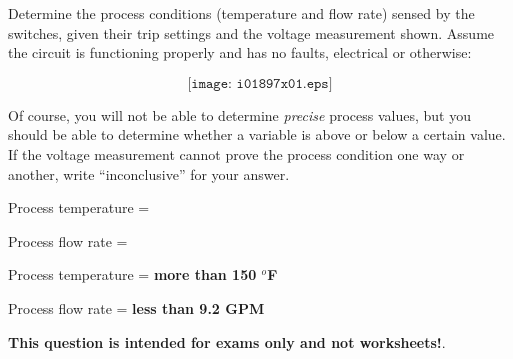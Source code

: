 

Determine the process conditions (temperature and flow rate) sensed by the switches, given their trip settings and the voltage measurement shown.  Assume the circuit is functioning properly and has no faults, electrical or otherwise:

$$\texttt{[image: i01897x01.eps]}$$

Of course, you will not be able to determine {\it precise} process values, but you should be able to determine whether a variable is above or below a certain value.  If the voltage measurement cannot prove the process condition one way or another, write ``inconclusive'' for your answer.

\vskip 30pt

Process temperature = 

\vskip 30pt

Process flow rate = 







Process temperature = {\bf more than 150 $^{o}$F}

Process flow rate = {\bf less than 9.2 GPM}







{\bf This question is intended for exams only and not worksheets!}.


